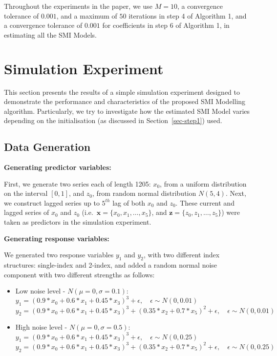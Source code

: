\documentclass[
  11pt,
  a4paper,
]{article}
\begin{document}
Throughout the experiments in the paper, we use \(M = 10\), a
convergence tolerance of \(0.001\), and a maximum of \(50\) iterations
in step 4 of Algorithm 1, and a convergence tolerance of \(0.001\) for
coefficients in step 6 of Algorithm 1, in estimating all the SMI Models.

\section{Simulation Experiment}\label{sec-simulation}

This section presents the results of a simple simulation experiment
designed to demonstrate the performance and characteristics of the
proposed SMI Modelling algorithm. Particularly, we try to investigate
how the estimated SMI Model varies depending on the initialisation (as
discussed in Section~\ref{sec-step1}) used.

\subsection{Data Generation}\label{sec-datagen}

\textbf{Generating predictor variables:}

First, we generate two series each of length 1205: \(x_{0}\), from a
uniform distribution on the interval \([0, 1]\), and \(z_{0}\), from
random normal distribution \(N(5, 4)\). Next, we construct lagged series
up to \(5^{th}\) lag of both \(x_{0}\) and \(z_{0}\). These current and
lagged series of \(x_{0}\) and \(z_{0}\)
(i.e.~\(\bm{x} = \{x_{0}, x_{1}, \dots, x_{5}\}\), and
\(\bm{z} = \{z_{0}, z_{1}, \dots, z_{5}\}\)) were taken as predictors in
the simulation experiment.

\textbf{Generating response variables:}

We generated two response variables \(y_{1}\) and \(y_{2}\), with two
different index structures: single-index and 2-index, and added a random
normal noise component with two different strengths as follows:

\begin{itemize}
\item
  Low noise level - \(N(\mu = 0, \sigma = 0.1)\):\\
  \(y_{1} = (0.9*x_{0} + 0.6*x_{1} + 0.45*x_{3})^3 + \epsilon, \quad \epsilon\sim N(0, 0.01)\)\\
  \(y_{2} = (0.9*x_{0} + 0.6*x_{1} + 0.45*x_{3})^3 + (0.35*x_{2} + 0.7*x_{5})^2 + \epsilon, \quad \epsilon\sim N(0, 0.01)\)
\item
  High noise level - \(N(\mu = 0, \sigma = 0.5)\):\\
  \(y_{1} = (0.9*x_{0} + 0.6*x_{1} + 0.45*x_{3})^3 + \epsilon, \quad \epsilon\sim N(0, 0.25)\)\\
  \(y_{2} = (0.9*x_{0} + 0.6*x_{1} + 0.45*x_{3})^3 + (0.35*x_{2} + 0.7*x_{5})^2 + \epsilon, \quad \epsilon\sim N(0, 0.25)\)
\end{itemize}
\end{document}
